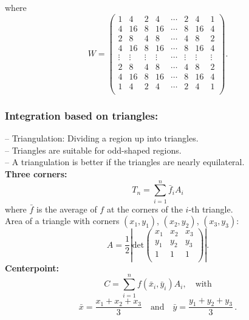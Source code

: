 where
$$
W = \left( \begin{array}{cccccccc}
           1 & 4 & 2 & 4 & \cdots & 2 & 4 & 1 \\
           4 & 16 & 8 & 16 & \cdots & 8 & 16 & 4 \\
           2 & 8 & 4 & 8 & \cdots & 4 & 8 & 2 \\
           4 & 16 & 8 & 16 & \cdots & 8 & 16 & 4 \\
        \vdots & \vdots & \vdots & \vdots & \cdots & \vdots & \vdots & \vdots \\
           2 & 8 & 4 & 8 & \cdots & 4 & 8 & 2 \\
           4 & 16 & 8 & 16 & \cdots & 8 & 16 & 4 \\
           1 & 4 & 2 & 4 & \cdots & 2 & 4 & 1 \\
           \end{array}
    \right).
$$

\subsubsection*{Integration based on triangles:}
-- Triangulation: Dividing a region up into triangles.\\
-- Triangles are suitable for odd-shaped regions.\\
-- A triangulation is better if the triangles are nearly equilateral.\\
{\bf Three corners:}
$$
   T_n = \sum_{i=1}^n \bar{f}_i A_i
$$
where $\bar{f}$ is the average of $f$ at the corners of the $i$-th triangle.\\
Area of a triangle with corners $(x_1,y_1)$, $(x_2,y_2)$, $(x_3,y_3)$:
\begin{equation*}
A =
\frac{1}{2}\left|
\text{det}\left(
\begin{array}{ccc}
x_1	&x_2	&x_3\\
y_1	&y_2	&y_3\\
1	&1	&1\\
\end{array}
\right)
\right|
.
\end{equation*}
%
{\bf Centerpoint:}
$$
   C = \sum_{i=1}^n f(\bar{x}_i,\bar{y}_i) A_i,
\quad\text{with}
$$
$$
\bar{x} = \frac{x_1 + x_2 + x_3}{3}
\quad\text{and}\quad
 \bar{y} = \frac{y_1 + y_2 + y_3}{3}
\,.
$$

